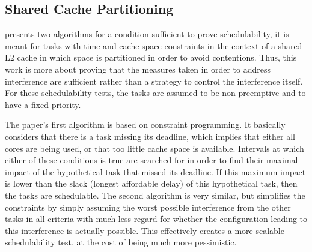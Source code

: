 \subsection{Shared Cache Partitioning}
\cite{10.1145/1629335.1629369} presents two algorithms for a condition
sufficient to prove schedulability, it is meant for tasks with time and cache
space constraints in the context of a shared L2 cache in which space is
partitioned in order to avoid contentions.  Thus, this work is more about
proving that the measures taken in order to address interference are sufficient
rather than a strategy to control the interference itself. For these
schedulability tests, the tasks are assumed to be non-preemptive and to have a
fixed priority.

The paper's first algorithm is based on constraint programming. It basically
considers that there is a task missing its deadline, which implies that either
all cores are being used, or that too little cache space is available.
Intervals at which either of these conditions is true are searched for in order
to find their maximal impact of the hypothetical task that missed its deadline.
If this maximum impact is lower than the slack (longest affordable delay) of
this hypothetical task, then the tasks are schedulable. The second algorithm is
very similar, but simplifies the constraints by simply assuming the worst
possible interference from the other tasks in all criteria with much less
regard for whether the configuration leading to this interference is actually
possible. This effectively creates a more scalable schedulability test, at the
cost of being much more pessimistic.
